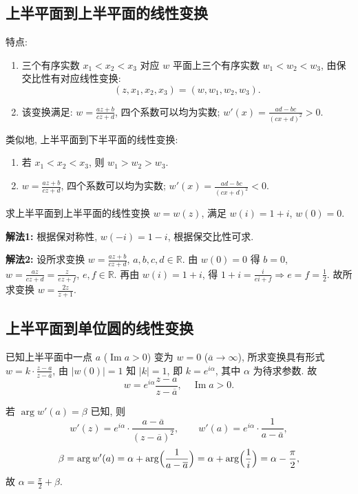 \documentclass[theorem=false,mathfont=none,openany,sub3section]{easybook}
\begin{document}
\subsection{上半平面到上半平面的线性变换}

特点:
\begin{enumerate}
  \item 三个有序实数 $x_{1}<x_{2}<x_{3}$ 对应 $w$ 平面上三个有序实数 $w_{1}<w_{2}<w_{3}$, 由保交比性有对应线性变换:
  \[
  (z,x_{1},x_{2},x_{3})=(w,w_{1},w_{2},w_{3}).
  \]
  \item 该变换满足: $w=\frac{az+b}{cz+d}$, 四个系数可以均为实数; $w'(x)=\frac{ad-bc}{(cx+d)^{2}}>0$.
\end{enumerate}

类似地, 上半平面到下半平面的线性变换:
\begin{enumerate}
  \item 若 $x_{1}<x_{2}<x_{3}$, 则 $w_{1}>w_{2}>w_{3}$.
  \item $w=\frac{az+b}{cz+d}$, 四个系数可以均为实数; $w'(x)=\frac{ad-bc}{(cx+d)^{2}}<0$.
\end{enumerate}

\begin{example}
  求上半平面到上半平面的线性变换 $w=w(z)$, 满足 $w(i)=1+i$, $w(0)=0$.

  \textbf{解法1:} 根据保对称性, $w(-i)=1-i$, 根据保交比性可求.

  \textbf{解法2:} 设所求变换 $w=\frac{az+b}{cz+d}$, $a,b,c,d\in\mathbb{R}$.
  由 $w(0)=0$ 得 $b=0$, $w=\frac{az}{cz+d}=\frac{z}{ez+f}$, $e,f\in\mathbb{R}$.
  再由 $w(i)=1+i$, 得 $1+i=\frac{i}{ei+f}\Rightarrow e=f=\frac{1}{2}$.
  故所求变换 $w=\frac{2z}{z+1}$.
\end{example}

\subsection{上半平面到单位圆的线性变换}

已知上半平面中一点 $a$ ($\operatorname{Im}a>0$) 变为 $w=0$ ($\overline{a}\to\infty$),
所求变换具有形式 $w=k\cdot\frac{z-a}{z-\overline{a}}$, 由 $|w(0)|=1$ 知 $|k|=1$, 即 $k=e^{i\alpha}$, 其中 $\alpha$ 为待求参数.
故
\[
w=e^{i\alpha}\frac{z-a}{z-\overline{a}},\quad \operatorname{Im}a>0.
\]

若 $\arg w'(a)=\beta$ 已知, 则
\[
w'(z)=e^{i\alpha}\cdot\frac{a-\overline{a}}{(z-\overline{a})^{2}},\qquad
w'(a)=e^{i\alpha}\cdot\frac{1}{a-\overline{a}},
\]
\[
\beta=\arg w'(a)=\alpha+\arg\Bigl(\frac{1}{a-\overline{a}}\Bigr)=\alpha+\arg\Bigl(\frac{1}{i}\Bigr)=\alpha-\frac{\pi}{2},
\]
故 $\alpha=\frac{\pi}{2}+\beta$.
\end{document}
